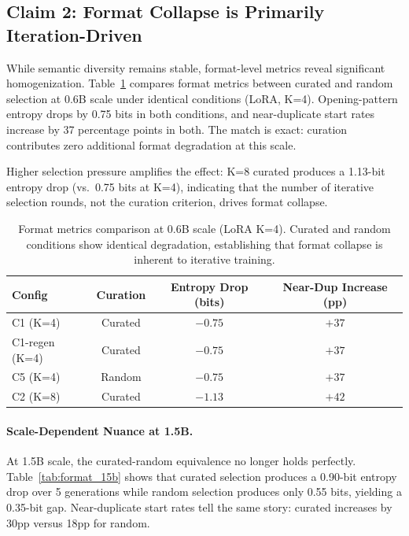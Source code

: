 \documentclass[11pt,a4paper]{article}
\begin{document}
\subsection{Claim 2: Format Collapse is Primarily Iteration-Driven}

While semantic diversity remains stable, format-level metrics reveal significant homogenization. Table~\ref{tab:format_06b} compares format metrics between curated and random selection at 0.6B scale under identical conditions (LoRA, K=4). Opening-pattern entropy drops by 0.75 bits in both conditions, and near-duplicate start rates increase by 37 percentage points in both. The match is exact: curation contributes zero additional format degradation at this scale.

Higher selection pressure amplifies the effect: K=8 curated produces a 1.13-bit entropy drop (vs.\ 0.75 bits at K=4), indicating that the number of iterative selection rounds, not the curation criterion, drives format collapse.

\begin{table}[t]
\centering
\caption{Format metrics comparison at 0.6B scale (LoRA K=4). Curated and random conditions show identical degradation, establishing that format collapse is inherent to iterative training.}
\label{tab:format_06b}
\small
\begin{tabular}{@{}lccc@{}}
\toprule
Config & Curation & Entropy Drop (bits) & Near-Dup Increase (pp) \\
\midrule
C1 (K=4) & Curated & $-0.75$ & $+37$ \\
C1-regen (K=4) & Curated & $-0.75$ & $+37$ \\
C5 (K=4) & Random  & $-0.75$ & $+37$ \\
C2 (K=8) & Curated & $-1.13$ & $+42$ \\
\bottomrule
\end{tabular}
\end{table}

\paragraph{Scale-Dependent Nuance at 1.5B.}
At 1.5B scale, the curated-random equivalence no longer holds perfectly. Table~\ref{tab:format_15b} shows that curated selection produces a 0.90-bit entropy drop over 5 generations while random selection produces only 0.55 bits, yielding a 0.35-bit gap. Near-duplicate start rates tell the same story: curated increases by 30pp versus 18pp for random.
\end{document}
